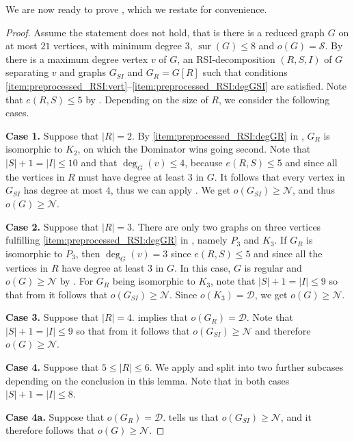 \documentclass[a4paper,11pt,oneside]{scrartcl}
\theoremstyle{definition}
\theoremstyle{remark}
\DeclareMathOperator{\sur}{sur}
\begin{document}
We are now ready to prove , which we restate for convenience.
\betathreesureigth*
\begin{proof}
    Assume the statement does not hold, that is there is a reduced graph $G$ on at most $21$ vertices, with minimum degree $3$, $\sur(G) \leq 8$ and $o(G) = \mathcal S$. By  there is a maximum degree vertex $v$ of $G$, an RSI-decomposition $(R,S,I)$ of $G$ separating $v$ and graphs $G_{SI}$ and $G_R = G[R]$ such that conditions \ref{item:preprocessed_RSI:vert}--\ref{item:preprocessed_RSI:degGSI} are satisfied. Note that $e(R,S) \leq 5$ by . Depending on the size of $R$, we consider the following cases.

    \textbf{Case 1.} Suppose that $|R| = 2$. By \ref{item:preprocessed_RSI:degGR} in , $G_R$ is isomorphic to $K_2$, on which the Dominator wins going second. Note that $|S|+1 = |I| \leq 10$ and that $\deg_G(v) \leq 4$, because $e(R,S) \leq 5$ and since all the vertices in $R$ must have degree at least $3$ in $G$. It follows that every vertex in $G_{SI}$ has degree at most $4$, thus we can apply . We get $o(G_{SI}) \geq \mathcal N$, and thus $o(G) \geq \mathcal N$.
    
    \textbf{Case 2.} Suppose that $|R| = 3$. There are only two graphs on three vertices fulfilling \ref{item:preprocessed_RSI:degGR} in , namely $P_3$ and $K_3$. If $G_R$ is isomorphic to $P_3$, then $\deg_G(v) = 3$ since $e(R,S) \leq 5$ and since all the vertices in $R$ have degree at least $3$ in $G$. In this case, $G$ is regular and $o(G) \geq \mathcal N$ by . For $G_R$ being isomorphic to $K_3$, note that $|S|+1 = |I| \leq 9$ so that from  it follows that $o(G_{SI}) \geq \mathcal N$. Since $o(K_3) = \mathcal D$, we get $o(G) \geq \mathcal N$.

    \textbf{Case 3.} Suppose that $|R| = 4$.  implies that $o(G_R) = \mathcal D$. Note that $|S|+1 = |I| \leq 9$ so that from  it follows that $o(G_{SI}) \geq \mathcal N$ and therefore $o(G) \geq \mathcal N$.

    \textbf{Case 4.} Suppose that $5 \leq |R| \leq 6$. We apply  and split into two further subcases depending on the conclusion in this lemma. Note that in both cases $|S|+1 = |I| \leq 8$.
    
    \textbf{Case 4a.} Suppose that $o(G_R)= \mathcal D$.  tells us that $o(G_{SI}) \geq \mathcal N$, and it therefore follows that $o(G) \geq \mathcal N$.
    

\end{proof}
\end{document}
